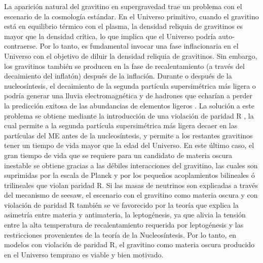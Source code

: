 La aparición natural del gravitino en supergravedad trae un problema
con el escenario de la cosmología estándar. En el Universo primitivo,
cuando el gravitino está en equilibrio térmico con el plasma, la
densidad reliquia de gravitinos es mayor que la densidad crítica, lo
que implica que el Universo podría auto-contraerse. Por lo tanto, es
fundamental invocar una fase inflacionaria en el Universo con el
objetivo de diluir la densidad reliquia de gravitinos. Sin embargo,
los gravitinos también se producen en la fase de recalentamiento (a
través del decaimiento del inflatón) después de la inflación. Durante
o después de la nucleosíntesis, el decaimiento de la segunda partícula
supersimétrica más ligera o  podría
generar una lluvia electromagnética y de hadrones que echarían a
perder la predicción exitosa de las abundancias de elementos ligeros
\cite{Sarkar:1995dd}. La solución a este problema se obtiene mediante
la introducción de una violación de paridad R
\cite{Takayama:2000uz, Buchmuller:2007ui}, la cual permite a la segunda partícula
supersimétrica más ligera decaer en las partículas del ME
antes de la nucleosíntesis, y permite a los restantes gravitinos tener
un tiempo de vida mayor que la edad del Universo. En este último caso,
el gran tiempo de vida que se requiere para un candidato de materia
oscura inestable se obtiene gracias a las débiles interacciones del
gravitino, las cuales son suprimidas por la escala de Planck y por los
pequeños acoplamientos bilineales ó trilineales que violan paridad
R. Si las masas de neutrinos son explicadas a través del mecanismo de
seesaw, el escenario con el gravitino como materia oscura y con
violación de paridad R también se ve favorecido por la teoría que
explica la asimetría entre materia y antimateria, la leptogénesis, ya
que alivia la tensión entre la alta temperatura de recalentamiento
requerida por leptogénesis y las restricciones provenientes de la
teoría de la Nucleosíntesis.  Por lo tanto, en modelos con violación de
paridad R, el gravitino como materia oscura producido en el Universo
temprano es viable y bien motivado.

